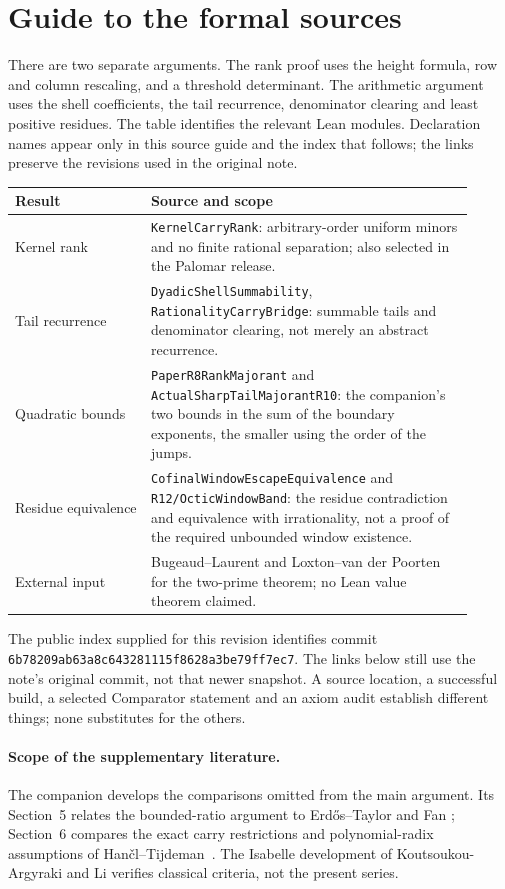 \documentclass[11pt]{article}
\begin{document}
\appendix
\section{Guide to the formal sources}\label{app:sources}
There are two separate arguments.  The rank proof uses the height formula,
row and column rescaling, and a threshold determinant.  The arithmetic
argument uses the shell coefficients, the tail recurrence, denominator
clearing and least positive residues.  The table identifies the relevant
Lean modules.  Declaration names appear only in this source guide and the
index that follows; the links preserve the revisions used in the original
note.

\begin{center}\small
\begin{tabular}{p{0.27\linewidth}p{0.64\linewidth}}
\hline
Result & Source and scope\\ \hline
Kernel rank & \nolinkurl{KernelCarryRank}: arbitrary-order uniform minors and
no finite rational separation; also selected in the Palomar release.\\
Tail recurrence & \nolinkurl{DyadicShellSummability},
\nolinkurl{RationalityCarryBridge}: summable tails and denominator
clearing, not merely an abstract recurrence.\\
Quadratic bounds & \nolinkurl{PaperR8RankMajorant} and
\nolinkurl{ActualSharpTailMajorantR10}: the companion's two bounds in the
sum of the boundary exponents, the smaller using the order of the jumps.\\
Residue equivalence & \nolinkurl{CofinalWindowEscapeEquivalence} and
\nolinkurl{R12/OcticWindowBand}: the residue contradiction and equivalence
with irrationality, not a proof of the required unbounded window existence.\\
External input & Bugeaud--Laurent and Loxton--van der Poorten for the
two-prime theorem; no Lean value theorem claimed.\\ \hline
\end{tabular}
\end{center}
The public index supplied for this revision identifies commit
\nolinkurl{6b78209ab63a8c643281115f8628a3be79ff7ec7}.  The links below still
use the note's original commit, not that newer snapshot.  A source
location, a successful build, a selected Comparator statement and an
axiom audit establish different things; none substitutes for the others.

\paragraph{Scope of the supplementary literature.}
The companion develops the comparisons omitted from the main argument.
Its Section~5 relates the bounded-ratio argument to Erd\H{o}s--Taylor
\cite[Theorem~1, p.~600]{erdostaylor1957} and Fan
\cite[Lemma~3.1, p.~7]{fan2026strongly}; Section~6 compares the exact
carry restrictions and polynomial-radix assumptions of
Han\v{c}l--Tijdeman~\cite[Theorems~2.2, 3.1 and 4.2]{hancltijdeman2008}.
The Isabelle development of Koutsoukou-Argyraki and Li
\cite{afperdosstraus2020} verifies classical criteria, not the present series.
\end{document}
